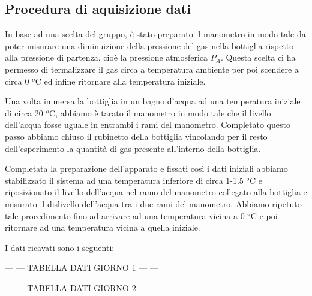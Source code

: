 \subsection{Procedura di aquisizione dati}
In base ad una scelta del gruppo, è stato preparato il manometro in modo tale da poter misurare una diminuizione della pressione del gas nella bottiglia rispetto alla pressione di partenza, cioè la pressione atmosferica $P_A$. Questa scelta ci ha permesso di termalizzare il gas circa a temperatura ambiente per poi scendere a circa 0 $^o$C ed infine ritornare alla temperatura iniziale.

Una volta immersa la bottiglia in un bagno d'acqua ad una temperatura iniziale di circa 20 $^o$C, abbiamo è tarato il manometro in modo tale che il livello dell'acqua fosse uguale in entrambi i rami del manometro. Completato questo passo abbiamo chiuso il rubinetto della bottiglia vincolando per il resto dell'esperimento la quantità di gas presente all'interno della bottiglia.

Completata la preparazione dell'apparato e fissati così i dati iniziali abbiamo stabilizzato il sistema ad una temperatura inferiore di circa 1-1.5 $^o$C e riposizionato il livello dell'acqua nel ramo del manometro collegato alla bottiglia e misurato il dislivello dell'acqua tra i due rami del manometro.
Abbiamo ripetuto tale procedimento fino ad arrivare ad una temperatura vicina a 0 $^o$C e poi ritornare ad una temperatura vicina a quella iniziale.

I dati ricavati sono i seguenti:

\begin{center}
	--- --- TABELLA DATI GIORNO 1 --- ---
	
	--- --- TABELLA DATI GIORNO 2 --- ---
\end{center}